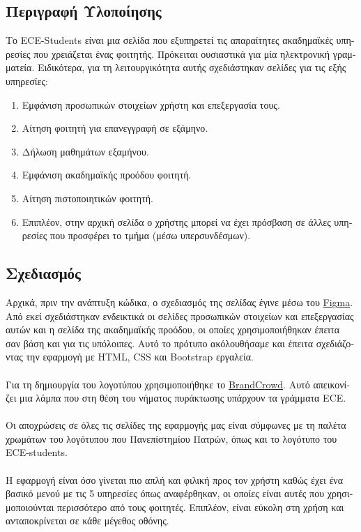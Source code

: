 \documentclass[manuscript,screen,review]{acmart}
\newcommand{\gr}[1]{\foreignlanguage{greek}{#1}}
\begin{document}
\subsection{\gr{Περιγραφή Υλοποίησης}}
\gr{Το} ECE-Students \gr{είναι μια σελίδα που εξυπηρετεί τις απαραίτητες ακαδημαϊκές υπηρεσίες που χρειάζεται ένας φοιτητής. Πρόκειται ουσιαστικά για μία ηλεκτρονική γραμματεία. Ειδικότερα, για  τη λειτουργικότητα αυτής σχεδιάστηκαν σελίδες για τις εξής υπηρεσίες:}
\begin{enumerate}
    \item \gr{Εμφάνιση προσωπικών στοιχείων χρήστη και επεξεργασία τους.}
    \item \gr{Αίτηση φοιτητή για επανεγγραφή σε εξάμηνο.}
    \item \gr{Δήλωση μαθημάτων εξαμήνου.}
    \item \gr{Εμφάνιση ακαδημαϊκής προόδου φοιτητή.}
    \item \gr{Αίτηση πιστοποιητικών φοιτητή.}
    \item \gr{Επιπλέον, στην αρχική σελίδα ο χρήστης μπορεί να έχει πρόσβαση σε άλλες υπηρεσίες που προσφέρει το τμήμα (μέσω υπερσυνδέσμων).}
\end{enumerate}

\subsection{\gr{Σχεδιασμός}}
\gr{Αρχικά, πριν την ανάπτυξη κώδικα, ο σχεδιασμός της σελίδας έγινε μέσω του} \href{https://www.figma.com}{Figma}. \gr{Από εκεί σχεδιάστηκαν ενδεικτικά οι σελίδες προσωπικών στοιχείων και επεξεργασίας αυτών και η σελίδα της ακαδημαϊκής προόδου, οι οποίες χρησιμοποιήθηκαν έπειτα σαν βάση και για τις υπόλοιπες. Αυτό το πρότυπο ακόλουθήσαμε και έπειτα σχεδιάζοντας την εφαρμογή με} HTML, CSS \gr{και} Bootstrap \gr{εργαλεία.}
\\
\\\gr{Για τη δημιουργία του λογοτύπου χρησιμοποιήθηκε το} \href{https://www.brandcrowd.com}{BrandCrowd}. \gr{Αυτό απεικονίζει μια λάμπα που στη θέση του νήματος πυράκτωσης υπάρχουν τα γράμματα} ECE.
\\
\\\gr{Οι αποχρώσεις σε όλες τις σελίδες της εφαρμογής μας είναι σύμφωνες με τη παλέτα χρωμάτων του λογότυπου που Πανεπίστημίου Πατρών, όπως και το λογότυπο του} ECE-students.
\\
\\\gr{Η εφαρμογή είναι όσο γίνεται πιο απλή και φιλική προς τον χρήστη καθώς έχει ένα βασικό μενού με τις 5 υπηρεσίες όπως αναφέρθηκαν, οι οποίες είναι αυτές που χρησιμοποιούνται περισσότερο από τους φοιτητές. Επιπλέον, είναι εύκολη στη χρήση και ανταποκρίνεται σε κάθε μέγεθος οθόνης.}
\end{document}
